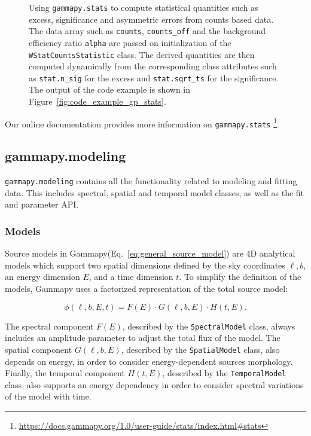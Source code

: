 \documentclass[longauth]{aa}
\newcommand{\code}[1]{\texttt{#1}}
\newcommand{\gammapy}{Gammapy\xspace}
\begin{document}
\begin{figure}
        \small
        \caption{
        Using \code{gammapy.stats} to compute statistical quantities
        such as excess, significance and asymmetric errors
        from counts based data. The data array such as \code{counts}, \code{counts\_off}
                and the background efficiency ratio \code{alpha} are passed on initialization
        of the \code{WStatCountsStatistic} class. The derived quantities
        are then computed dynamically from the corresponding class
        attributes such as \code{stat.n\_sig} for the excess
                and \code{stat.sqrt\_ts} for the significance.
                The output of the code example is shown in Figure~\ref{fig:code_example_gp_stats}.
    }
        \label{fig*:minted:gp_stats}
\end{figure}

Our online documentation provides more information on \code{gammapy.stats}
\footnote{\url{https://docs.gammapy.org/1.0/user-guide/stats/index.html\#stats}}. 


\subsection{gammapy.modeling}
\label{ssec:gammapy-modeling}
%
\code{gammapy.modeling} contains all the functionality related to modeling and fitting
data. This includes spectral, spatial and temporal model classes, as well as
the fit and parameter API.

\subsubsection{Models}
\label{sssec:models}
Source models in \gammapy (Eq.~\ref{eq:general_source_model}) are 4D 
analytical models which support two spatial dimensions defined by the sky coordinates
$\ell, b$, an energy dimension $E$, and a time dimension $t$. To simplify the definition of the
models, \gammapy uses a factorized representation of the total source
model:

\begin{equation}
    \phi(\ell, b, E, t) = F(E) \cdot G(\ell, b, E) \cdot H(t, E).
    \label{eq:source_model_dependency}
\end{equation}

The spectral component $F(E)$, described by the \code{SpectralModel} class, always
includes an amplitude parameter to adjust the total flux of the model.
The spatial component $G(\ell, b, E)$, described by the \code{SpatialModel} class,
also depends on energy, in order to consider energy-dependent sources morphology.
Finally, the temporal component $H(t, E)$, described by the \code{TemporalModel}
class, also supports an energy dependency in order to consider spectral variations
of the model with time.
\end{document}
